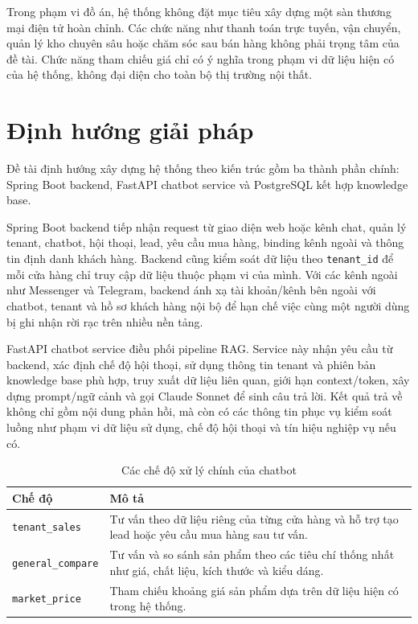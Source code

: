 \documentclass[../DoAn.tex]{subfiles}
\begin{document}
Trong phạm vi đồ án, hệ thống không đặt mục tiêu xây dựng một sàn thương mại điện tử hoàn chỉnh. Các chức năng như thanh toán trực tuyến, vận chuyển, quản lý kho chuyên sâu hoặc chăm sóc sau bán hàng không phải trọng tâm của đề tài. Chức năng tham chiếu giá chỉ có ý nghĩa trong phạm vi dữ liệu hiện có của hệ thống, không đại diện cho toàn bộ thị trường nội thất.

\section{Định hướng giải pháp}
\label{section:1.3}

Đề tài định hướng xây dựng hệ thống theo kiến trúc gồm ba thành phần chính: Spring Boot backend, FastAPI chatbot service và PostgreSQL kết hợp knowledge base.

Spring Boot backend tiếp nhận request từ giao diện web hoặc kênh chat, quản lý tenant, chatbot, hội thoại, lead, yêu cầu mua hàng, binding kênh ngoài và thông tin định danh khách hàng. Backend cũng kiểm soát dữ liệu theo \texttt{tenant\_id} để mỗi cửa hàng chỉ truy cập dữ liệu thuộc phạm vi của mình. Với các kênh ngoài như Messenger và Telegram, backend ánh xạ tài khoản/kênh bên ngoài với chatbot, tenant và hồ sơ khách hàng nội bộ để hạn chế việc cùng một người dùng bị ghi nhận rời rạc trên nhiều nền tảng.

FastAPI chatbot service điều phối pipeline RAG. Service này nhận yêu cầu từ backend, xác định chế độ hội thoại, sử dụng thông tin tenant và phiên bản knowledge base phù hợp, truy xuất dữ liệu liên quan, giới hạn context/token, xây dựng prompt/ngữ cảnh và gọi Claude Sonnet để sinh câu trả lời. Kết quả trả về không chỉ gồm nội dung phản hồi, mà còn có các thông tin phục vụ kiểm soát luồng như phạm vi dữ liệu sử dụng, chế độ hội thoại và tín hiệu nghiệp vụ nếu có.

\begin{table}[H]
\centering
\caption{Các chế độ xử lý chính của chatbot}
\label{table:chatbot_modes}
\begin{tabular}{|p{}|p{}|}
\hline
\textbf{Chế độ} & \textbf{Mô tả} \\
\hline
\texttt{tenant\_sales} & Tư vấn theo dữ liệu riêng của từng cửa hàng và hỗ trợ tạo lead hoặc yêu cầu mua hàng sau tư vấn. \\
\hline
\texttt{general\_compare} & Tư vấn và so sánh sản phẩm theo các tiêu chí thống nhất như giá, chất liệu, kích thước và kiểu dáng. \\
\hline
\texttt{market\_price} & Tham chiếu khoảng giá sản phẩm dựa trên dữ liệu hiện có trong hệ thống. \\
\hline
\end{tabular}
\end{table}
\end{document}
